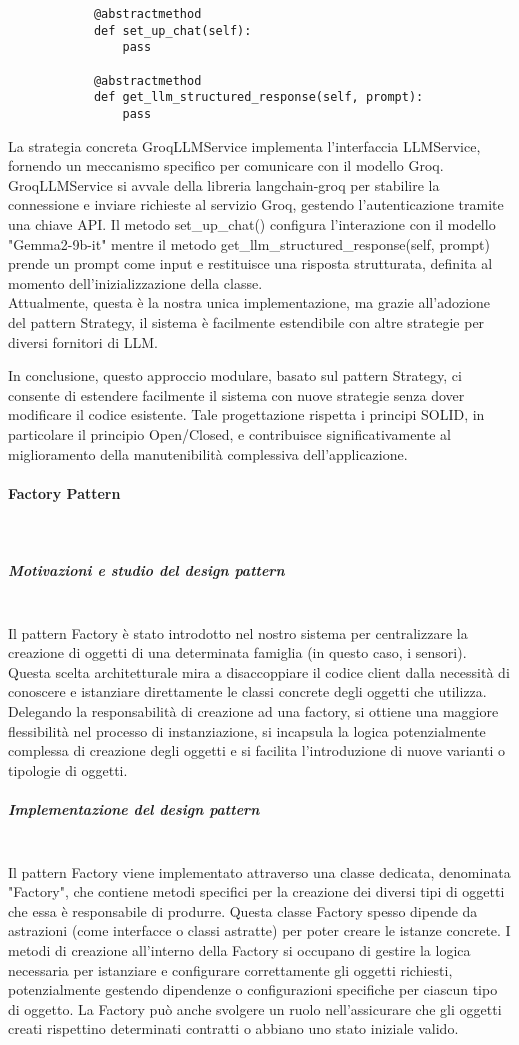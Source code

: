 \documentclass[10pt]{article}
\newcommand{\myparagraph}[1]{\paragraph{#1}\mbox{}\\}
\newcommand{\mysubparagraph}[1]{\subparagraph{#1}\mbox{}\\}
\begin{document}
\begin{itemize}
\begin{lstlisting}
            @abstractmethod
            def set_up_chat(self):
                pass

            @abstractmethod
            def get_llm_structured_response(self, prompt):
                pass
        \end{lstlisting}
        La strategia concreta GroqLLMService implementa l'interfaccia LLMService, fornendo un meccanismo specifico per comunicare con il modello Groq. GroqLLMService si avvale della libreria langchain-groq per stabilire la connessione e inviare richieste al servizio Groq, gestendo l'autenticazione tramite una chiave API. Il metodo set\_up\_chat() configura l'interazione con il modello "Gemma2-9b-it" mentre il metodo get\_llm\_structured\_response(self, prompt) prende un prompt come input e restituisce una risposta strutturata, definita al momento dell'inizializzazione della classe.\\
        Attualmente, questa è la nostra unica implementazione, ma grazie all'adozione del pattern Strategy, il sistema è facilmente estendibile con altre strategie per diversi fornitori di LLM.
        
    \end{itemize}
    In conclusione, questo approccio modulare, basato sul pattern Strategy, ci consente di estendere facilmente il sistema con nuove strategie senza dover modificare il codice esistente. Tale progettazione rispetta i principi SOLID, in particolare il principio Open/Closed, e contribuisce significativamente al miglioramento della manutenibilità complessiva dell'applicazione.

\myparagraph{Factory Pattern}

    \mysubparagraph{Motivazioni e studio del design pattern}
    Il pattern Factory è stato introdotto nel nostro sistema per centralizzare la creazione di oggetti di una determinata famiglia (in questo caso, i sensori). Questa scelta architetturale mira a disaccoppiare il codice client dalla necessità di conoscere e istanziare direttamente le classi concrete degli oggetti che utilizza. Delegando la responsabilità di creazione ad una factory, si ottiene una maggiore flessibilità nel processo di instanziazione, si incapsula la logica potenzialmente complessa di creazione degli oggetti e si facilita l'introduzione di nuove varianti o tipologie di oggetti.

    \mysubparagraph{Implementazione del design pattern}
    Il pattern Factory viene implementato attraverso una classe dedicata, denominata "Factory", che contiene metodi specifici per la creazione dei diversi tipi di oggetti che essa è responsabile di produrre. Questa classe Factory spesso dipende da astrazioni (come interfacce o classi astratte) per poter creare le istanze concrete. I metodi di creazione all'interno della Factory si occupano di gestire la logica necessaria per istanziare e configurare correttamente gli oggetti richiesti, potenzialmente gestendo dipendenze o configurazioni specifiche per ciascun tipo di oggetto. La Factory può anche svolgere un ruolo nell'assicurare che gli oggetti creati rispettino determinati contratti o abbiano uno stato iniziale valido.
\end{document}
